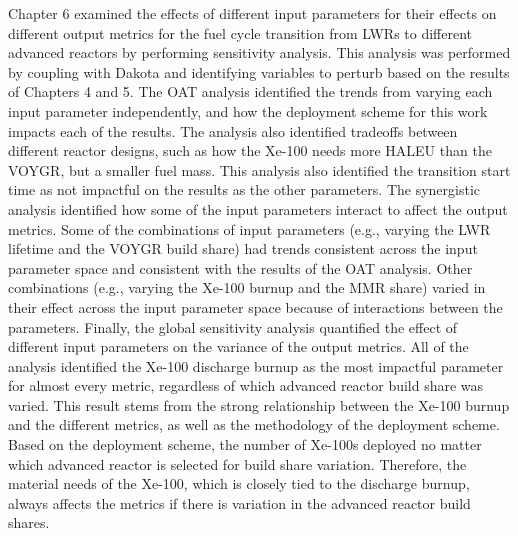 Chapter 6 examined the effects of different input parameters for 
their effects on different output metrics for the fuel cycle transition from 
\glspl{LWR} to different advanced reactors by performing sensitivity 
analysis. This analysis was performed by coupling \Cyclus with Dakota 
and identifying variables to perturb based on the results of Chapters 4 and 
5. The \acrfull{OAT} analysis identified the 
trends from varying each input parameter independently, and how the deployment 
scheme for this work impacts each of the results. The analysis also 
identified tradeoffs between different reactor designs, such as how the Xe-100 
needs more \gls{HALEU} than the VOYGR, but a smaller fuel mass. This 
analysis also identified the transition start time as not impactful on 
the results as the other parameters. The synergistic 
analysis identified how some of the input parameters interact to affect the output 
metrics. Some of the combinations of input parameters (e.g., varying 
the \gls{LWR} lifetime and the VOYGR build share) had trends consistent 
across the input parameter space and consistent with the results of 
the \gls{OAT} analysis. Other combinations (e.g., varying the Xe-100 
burnup and the \gls{MMR} share) varied in their effect across the input parameter 
space because of interactions between the parameters. Finally, the global 
sensitivity analysis quantified the effect of different input parameters 
on the variance of the output metrics. All of the analysis 
identified the Xe-100 discharge burnup as the most impactful parameter
for almost every metric, regardless of which advanced reactor build share 
was varied. This result stems from the strong relationship between 
the Xe-100 burnup and the different metrics, as well as the methodology 
of the deployment scheme. Based on the deployment scheme, the number of 
Xe-100s deployed no matter which advanced reactor is selected for 
build share variation. Therefore, the material needs of the 
Xe-100, which is closely tied to the discharge burnup, always 
affects the metrics if there is variation in the advanced reactor 
build shares. 

